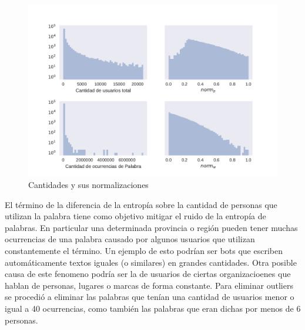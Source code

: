 \begin{figure}[!ht]
\centering
\includegraphics[width=1.0\textwidth]{./images/cantNorms.pdf}
\caption{Cantidades y sus normalizaciones} 
\label{fig:cantNorms} 
\end{figure}

El término de la diferencia de la entropía sobre la cantidad de personas que utilizan la palabra tiene como objetivo mitigar el ruido de la entropía de palabras. En particular una determinada provincia  o región pueden tener muchas ocurrencias de una palabra causado por algunos usuarios que utilizan constantemente el término. Un ejemplo de esto podrían ser bots que escriben automáticamente textos iguales (o similares) en grandes cantidades. Otra posible causa de este fenomeno podría ser la de usuarios de ciertas organizacioenes que hablan de personas, lugares o marcas de forma constante. 
Para eliminar outliers se procedió a eliminar las palabras que tenían una cantidad de usuarios menor o igual a 40 ocurrencias, como también las palabras que eran dichas por menos de 6 personas. 

%


